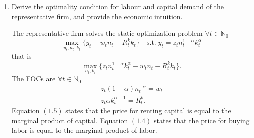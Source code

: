 \documentclass[dvipsnames,11pt]{article}
\begin{document}
\begin{enumerate}
            \textit{[HINT: Recall that bond supply must equal bond demand, and that all households make the same decisions since they are identical, or equivalently, there is a single representative household.]}

            \begin{solution}

                In the equilibrium, the rental rate for capital is positive (the production function has positive marginal products, so if the rental rate weren't positive, then factor demands would become unbounded, see \cite{krueger2012macroeconomic}). Therefore, the intertemporal price of consumption is positive. The optimality conditions then imply that the interest rate on bonds would be positive (both the rental rate for capital and the interest rate on bonds represent the intertemporal price of consumption). But if the interest rate on bonds is positive, the representative household demands bonds. Since bond supply must equal bond demand, and all households make the same decisions since they are identical, nobody supplies bonds. Therefore, in the stochastic economy, $\forall t \in \mathbb{N}_0,b_t=0$. 

                Alternatively, and more concisely, since bond market clears $\forall t, B_t =0$ and since there is a single representative household, it follows $\forall t, b_t=B_t=0$.

This condition also holds in the deterministic economy discussed in part 1, for the same reason: Either all households demand bonds, and nobody supplies, or all households supply bonds, and nobody demands, so that $\forall t \in \mathbb{N}_0,b_t=0$. 
                
            \end{solution}

            \item Derive the optimality condition for labour and capital demand of the representative firm, and provide the economic intuition.

            \begin{solution}

                 The representative firm solves the static optimization problem $\forall t \in \mathbb{N}_0$
\begin{equation*}
    \max_{y_t,n_t,k_t}\{y_t-w_tn_t-R_t^kk_t\} \quad \mathrm{s.t.}\;y_t=z_tn_t^{1-\alpha}k_t^\alpha
\end{equation*}
that is
\begin{equation*}
     \max_{n_t,k_t}\{z_tn_t^{1-\alpha}k_t^\alpha-w_tn_t-R_t^kk_t\}.
\end{equation*}
The FOCs are $\forall t \in \mathbb{N}_0$
\begin{gather}
    z_t(1-\alpha)n_t^{-\alpha} = w_t \\ z_t\alpha k_t^{\alpha-1}=R_t^k.
\end{gather}
Equation $(1.5)$ states that the price for renting capital is equal to the marginal product of capital. Equation $(1.4)$ states that the price for buying labor is equal to the marginal product of labor. 
                

\end{solution}
\end{enumerate}
\end{document}
